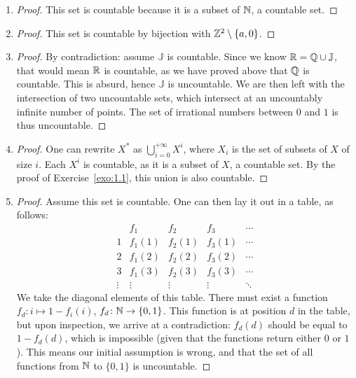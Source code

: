 \begin{solution}
\begin{enumerate}
	\item
	\begin{proof}
		This set is countable because it is a subset of \(\mathbb{N}\),
		a countable set.
	\end{proof}
	\item
	\begin{proof}
		This set is countable
		by bijection with \(\mathbb{Z}^2 \setminus \{a, 0\}\).
	\end{proof}
	\item
	\begin{proof}
		By contradiction:
		assume \(\mathbb{J}\) is countable.
		Since we know \(\mathbb{R} = \mathbb{Q} \cup \mathbb{J}\),
		that would mean \(\mathbb{R}\) is countable,
		as we have proved above that \(\mathbb{Q}\) is countable.
		This is absurd, hence \(\mathbb{J}\) is uncountable.
		We are then left with the intersection of two uncountable sets,
		which intersect at an uncountably infinite number of points.
		The set of irrational numbers between \(0\) and \(1\)
		is thus uncountable.
	\end{proof}
	\item
	\begin{proof}
		One can rewrite \(X^*\) as
		\(\bigcup_{i=0}^{+\infty} X^i\),
		where \(X_i\) is the set of subsets of \(X\) of size \(i\).
		Each \(X^i\) is countable, as it is a subset of \(X\),
		a countable set.
		By the proof of Exercise~\ref{exo:1.1},
		this union is also countable.
	\end{proof}
	\item
	\begin{proof}
		Assume this set is countable.
		One can then lay it out in a table,
		as follows:
		\[
		\begin{array}{c|cccc}
			& f_1 & f_2 & f_3 & \cdots \\
			\hline
			1 & f_1(1) & f_2(1) & f_3(1) & \cdots\\
			2 & f_1(2) & f_2(2) & f_3(2) & \cdots\\
			3 & f_1(3) & f_2(3) & f_3(3) & \cdots\\
			\vdots & \vdots & \vdots & \vdots & \ddots
		\end{array}
		\]
		We take the diagonal elements of this table.
		There must exist a function
		\(f_d \colon i \mapsto 1 - f_i(i)\),
		\(f_d \colon \mathbb{N} \to \{0, 1\}\).
		This function is at position \(d\) in the table,
		but upon inspection, we arrive at a contradiction:
		\(f_d(d)\) should be equal to \(1 - f_d(d)\),
		which is impossible
		(given that the functions return either \(0\) or \(1\)).
		This means our initial assumption is wrong,
		and that the set of all functions from \(\mathbb{N}\) to \(\{0, 1\}\)
		is uncountable.
	\end{proof}
\end{enumerate}
\end{solution}

